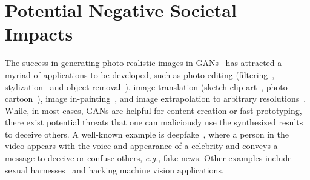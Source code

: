 \documentclass{article}
\begin{document}
\section{Potential Negative Societal Impacts}
The success in generating photo-realistic images in GANs~\cite{Brock2019LargeSG, karras2019style, karras2020analyzing} has attracted a myriad of applications to be developed, such as photo editing (filtering~\cite{kupyn2018deblurgan}, stylization~\cite{yang2019controllable} and object removal~\cite{shetty2018adversarial}), image translation (sketch  clip art~\cite{chen2018sketchygan}, photo  cartoon~\cite{chen2018cartoongan}), image in-painting~\cite{yeh2017semantic}, and image extrapolation to arbitrary resolutions~\cite{zhou2020omni}.
While, in most cases, GANs are helpful for content creation or fast prototyping, there exist potential threats that one can maliciously use the synthesized results to deceive others.
A well-known example is deepfake~\cite{nguyen2019deep}, where a person in the video appears with the voice and appearance of a celebrity and conveys a message to deceive or confuse others, \textit{e.g.}, fake news.
Other examples include sexual harnesses~\cite{Xu2018FairGANFG} and hacking machine vision applications.
\end{document}
